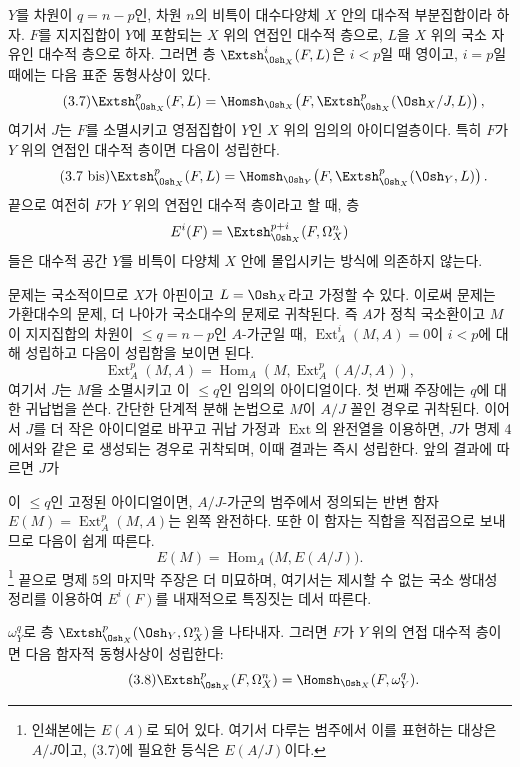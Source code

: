  $Y$를 차원이 $q=n-p$인, 차원 $n$의 비특이
대수다양체 $X$ 안의 대수적 부분집합이라 하자. $F$를 지지집합이
$Y$에 포함되는 $X$ 위의 연접인 대수적 층으로, $L$을 $X$ 위의
국소 자유인 대수적 층으로 하자. 그러면 층
$\Extsh_{\Osh_X}^{i}(F,L)$은 $i<p$일 때 영이고, $i=p$일 때에는 다음
표준 동형사상이 있다.
\begin{equation}\tag{3.7}
  \Extsh_{\Osh_X}^{p}(F,L)
  =\Homsh_{\Osh_X}\!\left(F,
  \Extsh_{\Osh_X}^{p}(\Osh_X/J,L)\right),
\end{equation}
여기서 $J$는 $F$를 소멸시키고 영점집합이 $Y$인 $X$ 위의 임의의
아이디얼층이다. 특히 $F$가 $Y$ 위의 연접인 대수적 층이면 다음이 성립한다.
\begin{equation}\tag{3.7 bis}
  \Extsh_{\Osh_X}^{p}(F,L)
  =\Homsh_{\Osh_Y}\!\left(F,\Extsh_{\Osh_X}^{p}(\Osh_Y,L)\right).
\end{equation}
끝으로 여전히 $F$가 $Y$ 위의 연접인 대수적 층이라고 할 때, 층
\[
  E^{i}(F)=\Extsh_{\Osh_X}^{p+i}(F,\Omega_X^{n})
\]
들은 대수적 공간 $Y$를 비특이 다양체 $X$ 안에 몰입시키는 방식에
의존하지 않는다.

문제는 국소적이므로 $X$가 아핀이고 $L=\Osh_X$라고 가정할 수 있다.
이로써 문제는 가환대수의 문제, 더 나아가 국소대수의 문제로 귀착된다. 즉
$A$가 정칙 국소환이고 $M$이 지지집합의 차원이
$\leq q=n-p$인 $A$-가군일 때, $\operatorname{Ext}_{A}^{i}(M,A)=0$이 $i<p$에 대해 성립하고 다음이 성립함을 보이면 된다.
\[
  \operatorname{Ext}_{A}^{p}(M,A)
  =\operatorname{Hom}_{A}\!\left(M,\operatorname{Ext}_{A}^{p}(A/J,A)\right),
\]
여기서 $J$는 $M$을 소멸시키고 이 $\leq q$인 임의의 아이디얼이다.
첫 번째 주장에는 $q$에 대한 귀납법을 쓴다. 간단한 단계적 분해 논법으로
$M$이 $A/J$ 꼴인 경우로 귀착된다. 이어서 $J$를 더 작은 아이디얼로
바꾸고 귀납 가정과 $\operatorname{Ext}$의 완전열을 이용하면, $J$가
명제 4에서와 같은 로 생성되는 경우로 귀착되며, 이때 결과는 즉시 성립한다. 앞의 결과에 따르면 $J$가

이 $\leq q$인 고정된 아이디얼이면, $A/J$-가군의 범주에서
정의되는 반변 함자 $E(M)=\operatorname{Ext}_{A}^{p}(M,A)$는 왼쪽
완전하다. 또한 이 함자는 직합을 직접곱으로 보내므로 다음이 쉽게 따른다.
\[
  E(M)=\operatorname{Hom}_{A}\bigl(M,E(A/J)\bigr).
\]
\footnote{인쇄본에는 $E(A)$로 되어 있다. 여기서 다루는 범주에서 이를
표현하는 대상은 $A/J$이고, (3.7)에 필요한 등식은 $E(A/J)$이다.} 끝으로
명제 5의 마지막 주장은 더 미묘하며, 여기서는 제시할 수 없는 국소
쌍대성 정리를 이용하여 $E^{i}(F)$를 내재적으로 특징짓는 데서 따른다.

 $\omega_Y^{q}$로 층
$\Extsh_{\Osh_X}^{p}(\Osh_Y,\Omega_X^{n})$을 나타내자. 그러면
$F$가 $Y$ 위의 연접 대수적 층이면 다음 함자적 동형사상이 성립한다:
\begin{equation}\tag{3.8}
  \Extsh_{\Osh_X}^{p}(F,\Omega_X^{n})
  =\Homsh_{\Osh_X}(F,\omega_Y^{q}).
\end{equation}

